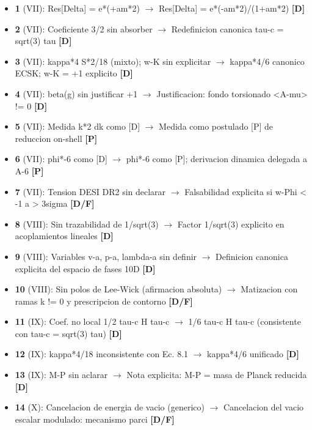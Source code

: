 ﻿\documentclass[11pt,letterpaper]{article}
\begin{document}
\begin{itemize}[leftmargin=*]
\item \textbf{1} (VII): Res[Delta] = e*(+am*2) $\rightarrow$ Res[Delta] = e*(-am*2)/(1+am*2) \textcolor{Dgreen}{\textbf{[D]}}
\item \textbf{2} (VII): Coeficiente 3/2 sin absorber $\rightarrow$ Redefinicion canonica tau-c = sqrt(3) tau \textcolor{Dgreen}{\textbf{[D]}}
\item \textbf{3} (VII): kappa*4 S*2/18 (mixto); w-K sin explicitar $\rightarrow$ kappa*4/6 canonico ECSK; w-K = +1 explicito \textcolor{Dgreen}{\textbf{[D]}}
\item \textbf{4} (VII): beta(g) sin justificar +1 $\rightarrow$ Justificacion: fondo torsionado <A-mu> != 0 \textcolor{Dgreen}{\textbf{[D]}}
\item \textbf{5} (VII): Medida k*2 dk como [D] $\rightarrow$ Medida como postulado [P] de reduccion on-shell \textcolor{Ppurple}{\textbf{[P]}}
\item \textbf{6} (VII): phi*-6 como [D] $\rightarrow$ phi*-6 como [P]; derivacion dinamica delegada a A-6 \textcolor{Ppurple}{\textbf{[P]}}
\item \textbf{7} (VII): Tension DESI DR2 sin declarar $\rightarrow$ Falsabilidad explicita si w-Phi < -1 a > 3sigma \textcolor{Dgreen}{\textbf{[D/F]}}
\item \textbf{8} (VIII): Sin trazabilidad de 1/sqrt(3) $\rightarrow$ Factor 1/sqrt(3) explicito en acoplamientos lineales \textcolor{Dgreen}{\textbf{[D]}}
\item \textbf{9} (VIII): Variables v-a, p-a, lambda-a sin definir $\rightarrow$ Definicion canonica explicita del espacio de fases 10D \textcolor{Dgreen}{\textbf{[D]}}
\item \textbf{10} (VIII): Sin polos de Lee-Wick (afirmacion absoluta) $\rightarrow$ Matizacion con ramas k != 0 y prescripcion de contorno \textcolor{Dgreen}{\textbf{[D/F]}}
\item \textbf{11} (IX): Coef. no local 1/2 tau-c H tau-c $\rightarrow$ 1/6 tau-c H tau-c (consistente con tau-c = sqrt(3) tau) \textcolor{Dgreen}{\textbf{[D]}}
\item \textbf{12} (IX): kappa*4/18 inconsistente con Ec. 8.1 $\rightarrow$ kappa*4/6 unificado \textcolor{Dgreen}{\textbf{[D]}}
\item \textbf{13} (IX): M-P sin aclarar $\rightarrow$ Nota explicita: M-P = masa de Planck reducida \textcolor{Dgreen}{\textbf{[D]}}
\item \textbf{14} (X): Cancelacion de energia de vacio (generico) $\rightarrow$ Cancelacion del vacio escalar modulado: mecanismo parci \textcolor{Dgreen}{\textbf{[D/F]}}

\end{itemize}
\end{document}
